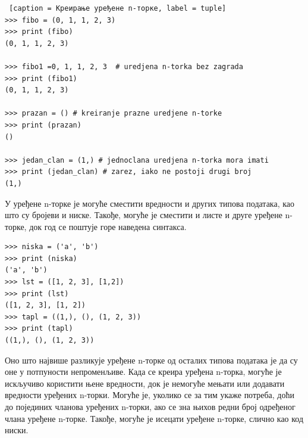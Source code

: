 \begin{lstlisting} [caption = Креирање уређене n-торке, label = tuple]
>>> fibo = (0, 1, 1, 2, 3)
>>> print (fibo)
(0, 1, 1, 2, 3)

>>> fibo1 =0, 1, 1, 2, 3  # uredjena n-torka bez zagrada
>>> print (fibo1)
(0, 1, 1, 2, 3)

>>> prazan = () # kreiranje prazne uredjene n-torke
>>> print (prazan)
()

>>> jedan_clan = (1,) # jednoclana uredjena n-torka mora imati
>>> print (jedan_clan) # zarez, iako ne postoji drugi broj
(1,)
\end{lstlisting}

У уређене n-торке је могуће сместити вредности и других типова података, као што су бројеви и ниске. Такође, могуће је сместити и листе и друге уређене n-торке, док год се поштује горе наведена синтакса.

\begin{lstlisting}[caption = Уређене n-торке могу садржати и ниске и  листе и друге уређене n-торке, label = str_lst_tuple]
>>> niska = ('a', 'b')
>>> print (niska)
('a', 'b')
>>> lst = ([1, 2, 3], [1,2])
>>> print (lst)
([1, 2, 3], [1, 2])
>>> tapl = ((1,), (), (1, 2, 3))
>>> print (tapl)
((1,), (), (1, 2, 3))
\end{lstlisting}

Оно што највише разликује уређене n-торке од осталих типова података је да су оне у потпуности непроменљиве. Када се креира уређена n-торка, могуће је искључиво користити њене вредности, док је немогуће мењати или додавати вредности уређених n-торки. Могуће је, уколико се за тим укаже потреба, доћи  до појединих чланова уређених n-торки, ако се зна њихов редни број одређеног члана уређене n-торке. Такође, могуће је исецати уређене n-торке, слично као код ниски.
